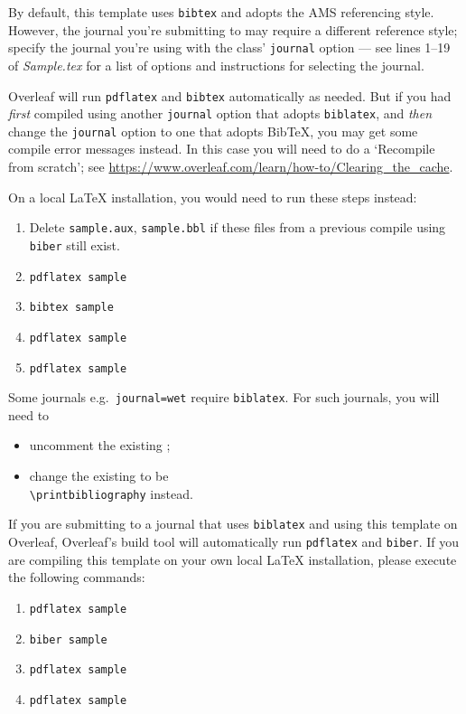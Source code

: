 \documentclass[journal=gmj]{CUP-JNL-DTM}%
\theoremstyle{definition}
\numberwithin{equation}{section}
\begin{document}
By default, this template uses \texttt{bibtex} and adopts the AMS referencing style. However, the journal you’re submitting to may require a different reference style; specify the journal you're using with the class' \texttt{journal} option --- see lines 1--19 of \emph{Sample.tex} for a list of options and instructions for selecting the journal.

Overleaf will run \texttt{pdflatex} and \texttt{bibtex} automatically as needed. But if you had \emph{first} compiled using another \texttt{journal} option that adopts \texttt{biblatex}, and \emph{then} change the \texttt{journal} option to one that adopts Bib\TeX{}, you may get some compile error messages instead. In this case you will need to do a `Recompile from scratch'; see \url{https://www.overleaf.com/learn/how-to/Clearing_the_cache}.

On a local \LaTeX{} installation, you would need to run these steps instead:
\begin{enumerate}
    \item Delete \texttt{sample.aux}, \texttt{sample.bbl} if these files from a previous compile using \texttt{biber} still exist.
    \item \verb|pdflatex sample|
    \item \verb|bibtex sample|
    \item \verb|pdflatex sample|
    \item \verb|pdflatex sample|
\end{enumerate}

Some journals e.g.~\texttt{journal=wet} require \texttt{biblatex}. For such journals, you will need to
\begin{itemize}
    \item uncomment the existing \verb||;
    \item change the existing \verb|| to be\\
    \verb|\printbibliography| instead.
\end{itemize}

If you are submitting to a journal that uses \texttt{biblatex} and using this template on Overleaf, Overleaf's build tool will automatically run \texttt{pdflatex} and \texttt{biber}. If you are compiling this template on your own local \LaTeX{} installation, please execute the following commands:
\begin{enumerate}
    \item \verb|pdflatex sample|
    \item \verb|biber sample|
    \item \verb|pdflatex sample|
    \item \verb|pdflatex sample|
\end{enumerate}
\end{document}
